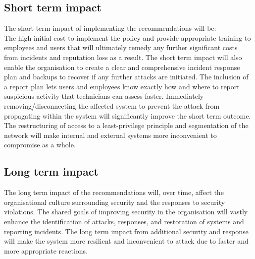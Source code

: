 \documentclass[conference]{IEEEtran}
\begin{document}
\subsection{Short term impact}
The short term impact of implementing the recommendations will be:\\
The high initial cost to implement the policy and provide appropriate training to employees and users that will ultimately remedy any further significant costs from incidents and reputation loss as a result. The short term impact will also enable the organisation to create a clear and comprehensive incident response plan and backups to recover if any further attacks are initiated. The inclusion of a report plan lets users and employees know exactly how and where to report suspicious activity that technicians can assess faster. Immediately removing/disconnecting the affected system to prevent the attack from propagating within the system will significantly improve the short term outcome. The restructuring of access to a least-privilege principle and segmentation of the network will make internal and external systems more inconvenient to compromise as a whole.

\subsection{Long term impact}
The long term impact of the recommendations will, over time, affect the organisational culture surrounding security and the responses to security violations. The shared goals of improving security in the organisation will vastly enhance the identification of attacks, responses, and restoration of systems and reporting incidents. The long term impact from additional security and response will make the system more resilient and inconvenient to attack due to faster and more appropriate reactions.
\end{document}
